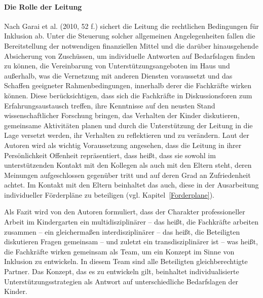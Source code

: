 \paragraph{Die Rolle der Leitung}
Nach Garai et al. (2010, 52 f.) sichert die Leitung die rechtlichen Bedingungen für Inklusion ab. Unter die Steuerung solcher allgemeinen Angelegenheiten fallen die Bereitstellung der notwendigen finanziellen Mittel und die darüber hinausgehende Absicherung von Zuschüssen, um individuelle Antworten auf Bedarfslagen finden zu können, die Vereinbarung von Unterstützungsangeboten im Haus und außerhalb, was die Vernetzung mit anderen Diensten voraussetzt und das Schaffen geeigneter Rahmenbedingungen, innerhalb derer die Fachkräfte wirken können. Diese berücksichtigen, dass sich die Fachkräfte in Diskussionsforen zum Erfahrungsaustausch treffen, ihre Kenntnisse auf den neusten Stand wissenschaftlicher Forschung bringen, das Verhalten der Kinder diskutieren, gemeinsame Aktivitäten planen und durch die Unterstützung der Leitung in die Lage versetzt werden, ihr Verhalten zu reflektieren und zu verändern. Laut der Autoren wird als wichtig Voraussetzung angesehen, dass die Leitung in ihrer Persönlichkeit Offenheit repräsentiert, dass heißt, dass sie sowohl im unterstützenden Kontakt mit den Kollegen als auch mit den Eltern steht, deren Meinungen aufgeschlossen gegenüber tritt und auf deren Grad an Zufriedenheit  achtet. Im Kontakt mit den Eltern beinhaltet das auch, diese in der Ausarbeitung individueller Förderpläne zu beteiligen (vgl. Kapitel~\ref{Forderplane}).

Als Fazit wird von den Autoren formuliert, dass der Charakter professioneller Arbeit im Kindergarten ein multidisziplinärer -- das heißt, die Fachkräfte arbeiten zusammen -- ein gleichermaßen interdisziplinärer -- das heißt, die Beteiligten diskutieren Fragen gemeinsam -- und zuletzt ein transdisziplinärer ist -- was heißt, die Fachkräfte wirken gemeinsam als Team, um ein Konzept im Sinne von Inklusion zu entwickeln. In diesem Team sind alle Beteiligten gleichberechtigte Partner.  
Das Konzept, das es zu entwickeln gilt, beinhaltet individualisierte Unterstützungsstrategien als Antwort auf unterschiedliche Bedarfslagen der Kinder.  

